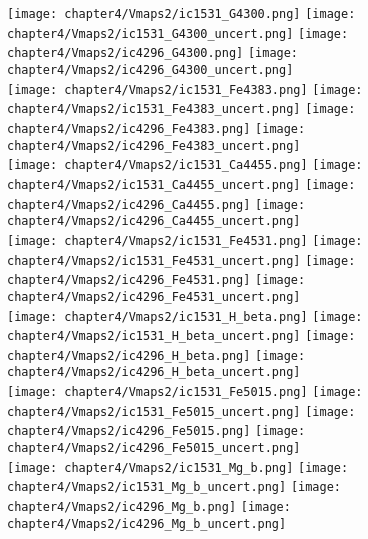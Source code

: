 \begin{figure*}
	\centering
	\texttt{[image: chapter4/Vmaps2/ic1531\_G4300.png]}
	\texttt{[image: chapter4/Vmaps2/ic1531\_G4300\_uncert.png]}
	\texttt{[image: chapter4/Vmaps2/ic4296\_G4300.png]}
	\texttt{[image: chapter4/Vmaps2/ic4296\_G4300\_uncert.png]}
	\\
	\texttt{[image: chapter4/Vmaps2/ic1531\_Fe4383.png]}
	\texttt{[image: chapter4/Vmaps2/ic1531\_Fe4383\_uncert.png]}
	\texttt{[image: chapter4/Vmaps2/ic4296\_Fe4383.png]}
	\texttt{[image: chapter4/Vmaps2/ic4296\_Fe4383\_uncert.png]}
	\\
	\texttt{[image: chapter4/Vmaps2/ic1531\_Ca4455.png]}
	\texttt{[image: chapter4/Vmaps2/ic1531\_Ca4455\_uncert.png]}
	\texttt{[image: chapter4/Vmaps2/ic4296\_Ca4455.png]}
	\texttt{[image: chapter4/Vmaps2/ic4296\_Ca4455\_uncert.png]}
	\\
	\texttt{[image: chapter4/Vmaps2/ic1531\_Fe4531.png]}
	\texttt{[image: chapter4/Vmaps2/ic1531\_Fe4531\_uncert.png]}
	\texttt{[image: chapter4/Vmaps2/ic4296\_Fe4531.png]}
	\texttt{[image: chapter4/Vmaps2/ic4296\_Fe4531\_uncert.png]}
	\\
	\texttt{[image: chapter4/Vmaps2/ic1531\_H\_beta.png]}
	\texttt{[image: chapter4/Vmaps2/ic1531\_H\_beta\_uncert.png]}
	\texttt{[image: chapter4/Vmaps2/ic4296\_H\_beta.png]}
	\texttt{[image: chapter4/Vmaps2/ic4296\_H\_beta\_uncert.png]}
	\\
	\texttt{[image: chapter4/Vmaps2/ic1531\_Fe5015.png]}
	\texttt{[image: chapter4/Vmaps2/ic1531\_Fe5015\_uncert.png]}
	\texttt{[image: chapter4/Vmaps2/ic4296\_Fe5015.png]}
	\texttt{[image: chapter4/Vmaps2/ic4296\_Fe5015\_uncert.png]}
	\\
	\texttt{[image: chapter4/Vmaps2/ic1531\_Mg\_b.png]}
	\texttt{[image: chapter4/Vmaps2/ic1531\_Mg\_b\_uncert.png]}
	\texttt{[image: chapter4/Vmaps2/ic4296\_Mg\_b.png]}
	\texttt{[image: chapter4/Vmaps2/ic4296\_Mg\_b\_uncert.png]}
	\\
\end{figure*}

